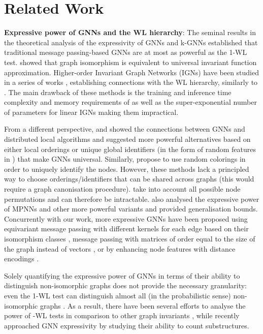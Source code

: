 \documentclass{article} \usepackage{iclr2021_conference,times}
\begin{document}
 
 \section{Related Work}

\noindent\textbf{Expressive power of GNNs and the WL hierarchy}: The seminal results in the theoretical analysis of the expressivity of GNNs \citep{xu2018how} and k-GNNs \citep{morris2019weisfeiler} established that traditional message passing-based GNNs are at most as powerful as the 1-WL test. \citet{chen2019equivalence} showed that graph isomorphism is equivalent to universal invariant function approximation. Higher-order Invariant Graph Networks (IGNs) have been studied in a series of works \citep{DBLP:conf/iclr/MaronBSL19, pmlr-v97-maron19a, maron2019provably, chen2019equivalence, keriven2019universal, puny2020graph}, establishing connections with the WL hierarchy, similarly to \cite{morris2019weisfeiler, MorrisNeurips2020}. The main drawback of these methods is the training and inference time complexity and memory requirements of  as well as the super-exponential number of parameters for linear IGNs making them impractical. 

From a different perspective, \cite{sato2019approximation} and \cite{Loukas2020What} showed the connections between GNNs and distributed local algorithms \citep{angluin1980local, linial1992locality, DBLP:conf/stoc/NaorS93} and suggested more powerful alternatives based on either local orderings or unique global identifiers (in the form of random features in \cite{sato2020random}) that make GNNs universal. Similarly, \cite{clip_ijcai20} propose to use random colorings in order to uniquely identify the nodes. However, these methods lack a principled way to choose orderings/identifiers that can be shared across graphs (this would require a graph canonisation procedure).   \cite{DBLP:conf/icml/Murphy0R019} take into account all possible node permutations and can therefore be intractable. \cite{DBLP:Garg2020icml} also analysed the expressive power of MPNNs and other more powerful variants and provided generalisation bounds. Concurrently with our work, more expressive GNNs have been proposed 
using equivariant message passing with different kernels for each edge based on their isomorphism classes \citep{de2020natural}, message passing with matrices of order equal to the size of the graph instead of vectors \citep{vignac2020building}, or by enhancing node features with distance encodings \citep{li2020distance}.

Solely quantifying the  expressive power of GNNs in terms of their ability to distinguish non-isomorphic graphs does not provide the necessary granularity: even the 1-WL test can distinguish almost all (in the probabilistic sense) non-isomorphic graphs \citep{babai1980random}. As a result, there have been several efforts to analyse the power of -WL tests in comparison to other graph invariants \citep{furer2010power, furer2017combinatorial, DBLP:conf/fct/ArvindFKV19, DBLP:conf/icalp/DellGR18}, while recently \cite{chen2020can} approached GNN expressivity by studying their ability to count substructures.
\end{document}
